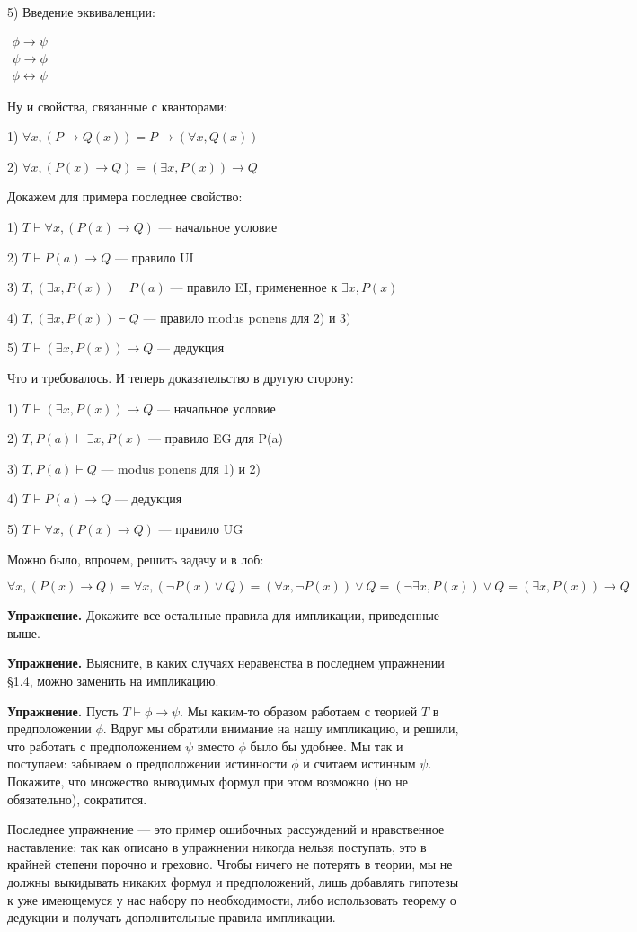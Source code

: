 5) Введение эквиваленции:

$\begin{array}{l}\phi\rightarrow\psi\\\psi\rightarrow\phi\\ \hline\phi\leftrightarrow\psi\end{array}$

Ну и свойства, связанные с кванторами:

1) $\forall x, (P\rightarrow Q(x)) = P\rightarrow (\forall x, Q(x))$

2) $\forall x, (P(x)\rightarrow Q) = (\exists x, P(x))\rightarrow Q$

Докажем для примера последнее свойство:

1) $T\vdash\forall x, (P(x)\rightarrow Q)$ — начальное условие

2) $T\vdash P(a)\rightarrow Q$ — правило UI

3) $T, (\exists x, P(x))\vdash P(a)$ — правило EI, примененное к $\exists x, P(x)$

4) $T, (\exists x, P(x)) \vdash Q$ — правило modus ponens для 2) и 3)

5) $T\vdash(\exists x, P(x))\rightarrow Q$ — дедукция

Что и требовалось. И теперь доказательство в другую сторону:

1) $T\vdash(\exists x, P(x))\rightarrow Q$ — начальное условие

2) $T, P(a) \vdash \exists x, P(x)$ — правило EG для P(a)

3) $T, P(a) \vdash Q$ — modus ponens для 1) и 2)

4) $T\vdash P(a)\rightarrow Q$ — дедукция

5) $T\vdash \forall x, (P(x)\rightarrow Q)$ — правило UG

Можно было, впрочем, решить задачу и в лоб:

$\forall x, (P(x)\rightarrow Q) = \forall x, (\neg P(x) \vee Q) = (\forall x, \neg P(x)) \vee Q = (\neg\exists x, P(x))\vee Q = (\exists x, P(x))\rightarrow Q$

{\bfseries Упражнение.} Докажите все остальные правила для импликации, приведенные выше.

{\bfseries Упражнение.} Выясните, в каких случаях неравенства в последнем упражнении §1.4, можно заменить на импликацию.

{\bfseries Упражнение.} Пусть $T\vdash\phi\rightarrow\psi$. Мы каким-то образом работаем с теорией $T$ в предположении $\phi$. Вдруг мы обратили внимание на нашу импликацию, и решили, что работать с предположением $\psi$ вместо $\phi$ было бы удобнее. Мы так и поступаем: забываем о предположении истинности $\phi$ и считаем истинным $\psi$. Покажите, что множество выводимых формул при этом возможно (но не обязательно), сократится.

Последнее упражнение — это пример ошибочных рассуждений и нравственное наставление: так как описано в упражнении никогда нельзя поступать, это в крайней степени порочно и греховно. Чтобы ничего не потерять в теории, мы не должны выкидывать никаких формул и предположений, лишь добавлять гипотезы к уже имеющемуся у нас набору по необходимости, либо использовать теорему о дедукции и получать дополнительные правила импликации.
